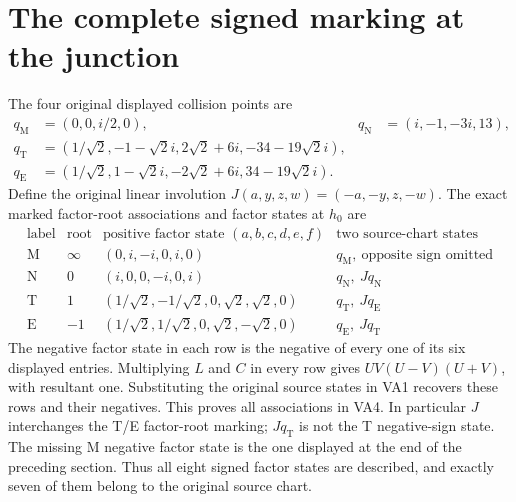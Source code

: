 \documentclass[11pt]{article}
\begin{document}
\section{The complete signed marking at the junction}
The four original displayed collision points are
\[
\begin{aligned}
 q_{\mathrm M}&=(0,0,i/2,0),&q_{\mathrm N}&=(i,-1,-3i,13),\\
 q_{\mathrm T}&=(1/\sqrt2,-1-\sqrt2i,2\sqrt2+6i,-34-19\sqrt2i),\\
 q_{\mathrm E}&=(1/\sqrt2,1-\sqrt2i,-2\sqrt2+6i,34-19\sqrt2i).
\end{aligned}
\]
Define the original linear involution
$J(a,y,z,w)=(-a,-y,z,-w)$. The exact marked factor-root
associations and factor states at $h_0$ are
\begin{equation}
\begin{array}{c|c|c|c}
\text{label}&\text{root}&\text{positive factor state }(a,b,c,d,e,f)
                         &\text{two source-chart states}\\\hline
\mathrm M&\infty&(0,i,-i,0,i,0)&q_{\mathrm M},\ \text{opposite sign omitted}\\
\mathrm N&0&(i,0,0,-i,0,i)&q_{\mathrm N},\ Jq_{\mathrm N}\\
\mathrm T&1&(1/\sqrt2,-1/\sqrt2,0,\sqrt2,\sqrt2,0)
                       &q_{\mathrm T},\ Jq_{\mathrm E}\\
\mathrm E&-1&(1/\sqrt2,1/\sqrt2,0,\sqrt2,-\sqrt2,0)
                       &q_{\mathrm E},\ Jq_{\mathrm T}
\end{array}\tag{VA4}
\end{equation}
The negative factor state in each row is the negative of
every one of its six displayed entries. Multiplying $L$ and
$C$ in every row gives $UV(U-V)(U+V)$, with resultant one.
Substituting the original source states in VA1 recovers these
rows and their negatives. This proves all associations in
VA4. In particular $J$ interchanges the T/E factor-root
marking; $Jq_{\mathrm T}$ is not the T negative-sign state.
The missing M negative factor state is the one displayed
at the end of the preceding section. Thus all eight signed
factor states are described, and exactly seven of them
belong to the original source chart.
\end{document}
